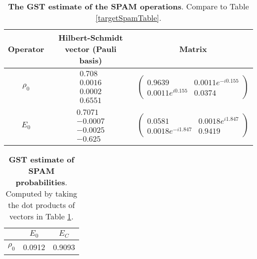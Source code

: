 \documentclass{article}[11pt]
\begin{document}
\begin{table}[h]
\begin{center}
\begin{tabular}[l]{|c|c|c|}
\hline
Operator & Hilbert-Schmidt vector (Pauli basis) & Matrix \\ \hline
$\rho_{0}$ & $ \begin{array}{c}
0.708 \\ 
0.0016 \\ 
0.0002 \\ 
0.6551
 \end{array} $
 & $ \left(\!\!\begin{array}{cc}
0.9639 & 0.0011e^{-i0.155} \\ 
0.0011e^{i0.155} & 0.0374
 \end{array}\!\!\right) $
 \\ \hline
$E_{0}$ & $ \begin{array}{c}
0.7071 \\ 
-0.0007 \\ 
-0.0025 \\ 
-0.625
 \end{array} $
 & $ \left(\!\!\begin{array}{cc}
0.0581 & 0.0018e^{i1.847} \\ 
0.0018e^{-i1.847} & 0.9419
 \end{array}\!\!\right) $
 \\ \hline
\end{tabular}

\caption{\textbf{The GST estimate of the SPAM operations}.  Compare to Table \ref{targetSpamTable}.\label{bestGatesetSpamTable}}
\end{center}
\end{table}

\begin{table}[h]
\begin{center}
\begin{tabular}[l]{|c|c|c|}
\hline
 & $E_{0}$ & $E_C$ \\ \hline
$\rho_{0}$ & 0.0912 & 0.9093 \\ \hline
\end{tabular}

\caption{\textbf{GST estimate of SPAM probabilities}.  Computed by taking the dot products of vectors in Table \ref{bestGatesetSpamTable}.\label{bestGatesetSpamParametersTable}}
\end{center}
\end{table}
\end{document}
